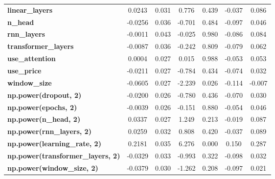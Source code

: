 \begin{center}
\begin{tabular}{lcccccc}
\textbf{linear\_layers}                   &       0.0243  &        0.031     &     0.776  &         0.439        &       -0.037    &        0.086     \\
\textbf{n\_head}                          &      -0.0256  &        0.036     &    -0.701  &         0.484        &       -0.097    &        0.046     \\
\textbf{rnn\_layers}                      &      -0.0011  &        0.043     &    -0.025  &         0.980        &       -0.086    &        0.084     \\
\textbf{transformer\_layers}              &      -0.0087  &        0.036     &    -0.242  &         0.809        &       -0.079    &        0.062     \\
\textbf{use\_attention}                   &       0.0004  &        0.027     &     0.015  &         0.988        &       -0.053    &        0.053     \\
\textbf{use\_price}                       &      -0.0211  &        0.027     &    -0.784  &         0.434        &       -0.074    &        0.032     \\
\textbf{window\_size}                     &      -0.0605  &        0.027     &    -2.239  &         0.026        &       -0.114    &       -0.007     \\
\textbf{np.power(dropout, 2)}             &      -0.0200  &        0.026     &    -0.780  &         0.436        &       -0.070    &        0.030     \\
\textbf{np.power(epochs, 2)}              &      -0.0039  &        0.026     &    -0.151  &         0.880        &       -0.054    &        0.046     \\
\textbf{np.power(n\_head, 2)}             &       0.0337  &        0.027     &     1.249  &         0.213        &       -0.019    &        0.087     \\
\textbf{np.power(rnn\_layers, 2)}         &       0.0259  &        0.032     &     0.808  &         0.420        &       -0.037    &        0.089     \\
\textbf{np.power(learning\_rate, 2)}      &       0.2181  &        0.035     &     6.276  &         0.000        &        0.150    &        0.287     \\
\textbf{np.power(transformer\_layers, 2)} &      -0.0329  &        0.033     &    -0.993  &         0.322        &       -0.098    &        0.032     \\
\textbf{np.power(window\_size, 2)}        &      -0.0379  &        0.030     &    -1.262  &         0.208        &       -0.097    &        0.021     \\

\end{tabular}
\end{center}
